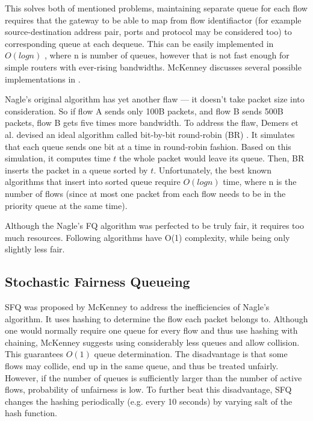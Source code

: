 
This solves both of mentioned problems, maintaining separate queue for each flow requires that the gateway to be able to map from flow identifiactor (for example source-destination address pair, ports and protocol may be considered too) to corresponding queue at each dequeue. This can be easily implemented in $O(log n)$ , where n is number of queues, however that is not fast enough for simple routers with ever-rising bandwidths. McKenney discusses several possible implementations in \cite[Section 2]{SFQ}.

Nagle's original algorithm has yet another flaw --- it doesn't take packet size into consideration. So if flow A sends only 100B packets, and flow B sends 500B packets, flow B gets five times more bandwidth. To address the flaw,  Demers et al. devised an ideal algorithm called bit-by-bit round-robin (BR) \cite{demers1989analysis}. It simulates that each queue sends one bit at a time in round-robin fashion. Based on this simulation, it computes time $t$ the whole packet would leave its queue. Then, BR inserts the packet in a queue sorted by $t$. Unfortunately, the best known algorithms that insert into sorted queue require $O(log n)$ time, where n is the number of flows (since at most one packet from each flow needs to be in the priority queue at the same time).

Although the Nagle's FQ algorithm was perfected to be truly fair, it requires too much resources. Following algorithms have O(1) complexity, while being only slightly less fair.


\subsection{Stochastic Fairness Queueing}

SFQ was proposed by McKenney \cite{SFQ} to address the inefficiencies of Nagle’s algorithm. It uses hashing to determine the flow each packet belongs to. Although one would normally require one queue for every flow and thus use hashing with chaining, McKenney suggests using considerably less queues and allow collision. This guarantees $O(1)$ queue determination. The disadvantage is that some flows may collide, end up in the same queue, and thus be treated unfairly. However, if the number of queues is sufficiently larger than the number of active flows, probability of unfairness is low. To further beat this disadvantage, SFQ changes the hashing periodically (e.g. every 10 seconds) by varying salt of the hash function.

